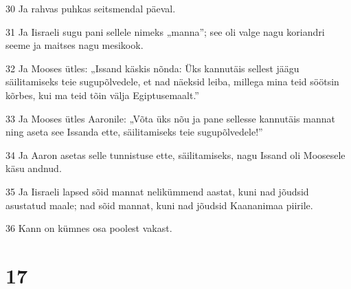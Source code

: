 \par 30 Ja rahvas puhkas seitsmendal päeval.
\par 31 Ja Iisraeli sugu pani sellele nimeks „manna”; see oli valge nagu koriandri seeme ja maitses nagu mesikook.
\par 32 Ja Mooses ütles: „Issand käskis nõnda: Üks kannutäis sellest jäägu säilitamiseks teie sugupõlvedele, et nad näeksid leiba, millega mina teid söötsin kõrbes, kui ma teid tõin välja Egiptusemaalt.”
\par 33 Ja Mooses ütles Aaronile: „Võta üks nõu ja pane sellesse kannutäis mannat ning aseta see Issanda ette, säilitamiseks teie sugupõlvedele!”
\par 34 Ja Aaron asetas selle tunnistuse ette, säilitamiseks, nagu Issand oli Moosesele käsu andnud.
\par 35 Ja Iisraeli lapsed sõid mannat nelikümmend aastat, kuni nad jõudsid asustatud maale; nad sõid mannat, kuni nad jõudsid Kaananimaa piirile.
\par 36 Kann on kümnes osa poolest vakast.

\chapter{17}

